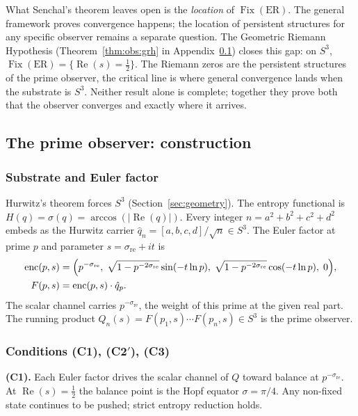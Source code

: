 \documentclass[12pt,a4paper]{article}
\theoremstyle{definition}
\theoremstyle{remark}
\begin{document}
What Senchal's theorem leaves open is the \emph{location} of
$\operatorname{Fix}(\mathrm{ER})$.  The general framework proves convergence
happens; the location of persistent structures for any specific observer
remains a separate question.  The Geometric Riemann Hypothesis
(Theorem~\ref{thm:obs:grh} in Appendix~\ref{obs:construction}) closes this
gap: on $S^3$, $\operatorname{Fix}(\mathrm{ER}) = \{\operatorname{Re}(s) =
\tfrac{1}{2}\}$.  The Riemann zeros are the persistent structures of the
prime observer,  the critical line is where general convergence lands when
the substrate is $S^3$.  Neither result alone is complete; together they
prove both that the observer converges and exactly where it arrives.

\subsection{The prime observer: construction}
\label{obs:construction}

\subsubsection{Substrate and Euler factor}

Hurwitz's theorem forces $S^3$ (Section~\ref{sec:geometry}).  The entropy
functional is $H(q) = \sigma(q) = \arccos(|\operatorname{Re}(q)|)$.  Every
integer $n = a^2+b^2+c^2+d^2$ embeds as the Hurwitz carrier
$\hat{q}_n = [a,b,c,d]/\sqrt{n} \in S^3$.  The Euler factor at prime $p$ and
parameter $s = \sigma_{\mathrm{re}} + it$ is
\begin{align}
  \operatorname{enc}(p,s) &= \Bigl(p^{-\sigma_{\mathrm{re}}},\;
    \sqrt{1-p^{-2\sigma_{\mathrm{re}}}}\sin(-t\ln p),\;
    \sqrt{1-p^{-2\sigma_{\mathrm{re}}}}\cos(-t\ln p),\; 0\Bigr), \\
  F(p,s) &= \operatorname{enc}(p,s)\cdot\hat{q}_p.
\end{align}
The scalar channel carries $p^{-\sigma_{\mathrm{re}}}$, the weight of this
prime at the given real part.  The running product
$Q_n(s) = F(p_1,s)\cdots F(p_n,s) \in S^3$ is the prime observer.

\subsubsection{Conditions (C1), (C2$'$), (C3)}

\textbf{(C1).}  Each Euler factor drives the scalar channel of $Q$ toward
balance at $p^{-\sigma_{\mathrm{re}}}$.  At $\operatorname{Re}(s)=\tfrac{1}{2}$
the balance point is the Hopf equator $\sigma=\pi/4$.  Any non-fixed state
continues to be pushed; strict entropy reduction holds.
\end{document}
